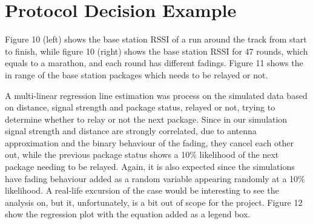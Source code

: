 \section{Protocol Decision Example}\label{sc:protocolDecisionExample}
Figure 10 (left) shows the base station RSSI of a run around the track from start to finish, while figure 10 (right) shows the base station RSSI for 47 rounds, which equals to a marathon, and each round has different fadings. Figure 11 shows the in range of the base station packages which needs to be relayed or not.



A multi-linear regression line estimation was process on the simulated data based on distance, signal strength and package status, relayed or not, trying to determine whether to relay or not the next package. Since in our simulation signal strength and distance are strongly correlated, due to antenna approximation and the binary behaviour of the fading, they cancel each other out, while the previous package status shows a 10\% likelihood of the next package needing to be relayed. Again, it is also expected since the simulations have fading behaviour added as a random variable appearing randomly at a 10\% likelihood. A real-life excursion of the case would be interesting to see the analysis on, but it, unfortunately, is a bit out of scope for the project. Figure 12 show the regression plot with the equation added as a legend box.

